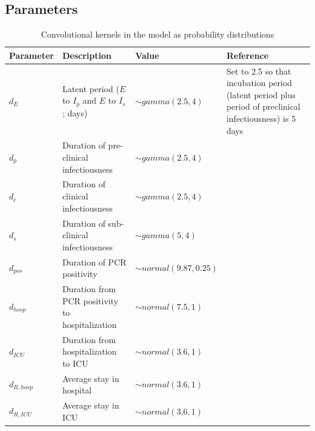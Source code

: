 \documentclass[12pt]{article}
\begin{document}
\newpage 
\subsection{Parameters}

\begin{center}
    \begin{table}[h]
    \caption{Convolutional kernels in the model as probability distributions}
    \centering
\begin{tabular}[H]{p{2cm}p{6cm}p{4cm}p{4cm}}
     \textbf{Parameter}& \textbf{Description}  & \textbf{Value}& \textbf{Reference} \\
     \midrule
     $d_E$ & Latent period ($E$ to $I_p$ and $E$ to $I_s$; days) & $\sim gamma(2.5,4)$& Set to 2.5 so that incubation period (latent period plus period of preclinical infectiousness) is 5 days\\
     $d_p$ & Duration of pre-clinical infectiousness& $\sim gamma(2.5,4)$ &  \\
     $d_c$ & Duration of clinical infectiousness& $\sim gamma(2.5,4)$ &  \\
     $d_s$ & Duration of sub-clinical infectiousness& $\sim gamma(5,4)$ &  \\
     $d_{pos}$ & Duration of PCR positivity& $\sim normal(9.87, 0.25)$ & \\ 
     $d_{hosp}$ & Duration from PCR positivity to hospitalization& $\sim normal(7.5, 1)$ & \\ 
     $d_{ICU}$ & Duration from hospitalization to ICU& $\sim normal(3.6, 1)$ & \\ 
     $d_{R,hosp}$ & Average stay in hospital& $\sim normal(3.6, 1)$ & \\ 
     $d_{R,ICU}$ & Average stay in ICU & $\sim normal(3.6, 1)$ & \\ 
\end{tabular}
\end{table}
\end{center}
\end{document}

